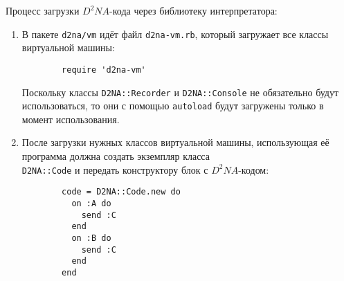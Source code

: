 \documentclass[utf8,a5paper,portrait,10pt,twoside]{eskdtext}
\begin{document}
Процесс загрузки $D^2NA$-кода через библиотеку интерпретатора:
\begin{enumerate}
  \item В пакете \texttt{d2na/vm} идёт файл \texttt{d2na-vm.rb}, который
        загружает все классы виртуальной машины:

        \begin{verbatim}
        require 'd2na-vm'
        \end{verbatim}

        Поскольку классы \texttt{D2NA::Recorder} и \texttt{D2NA::Console} не
        обязательно будут использоваться, то они с помощью \texttt{autoload}
        будут загружены только в момент использования.
  \item После загрузки нужных классов виртуальной машины, использующая её 
        программа должна создать экземпляр класса\\ \texttt{D2NA::Code} и
        передать конструктору блок с $D^2NA$-кодом:

        \begin{verbatim}
        code = D2NA::Code.new do
          on :A do
            send :C
          end
          on :B do
            send :C
          end
        end
        \end{verbatim}


\end{enumerate}
\end{document}

